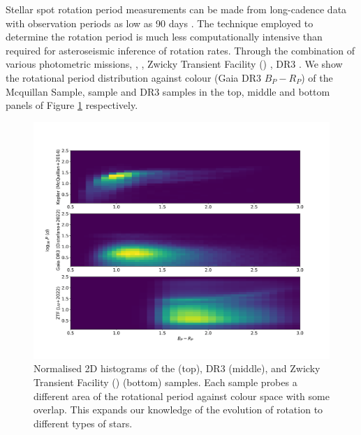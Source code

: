 Stellar spot rotation period measurements can be made from long-cadence data with observation periods as low as 90 days \citep{mcquillan_rotation_2014}.
The technique employed to determine the rotation period is much less computationally intensive than required for asteroseismic inference of rotation rates.
Through the combination of various photometric missions, \kepler{} \citep{mcquillan_rotation_2014, santos_surface_2021}, \ktoo{} \citep{santos_surface_2021}, Zwicky Transient Facility (\ZTF) \citep{lu_bridging_2022}, \gaia{} DR3 \citep{distefano_gaia_2022}. %
We show the rotational period distribution against colour (Gaia DR3 $B_P - R_P$) of the \kepler{} Mcquillan Sample, \ZTF{} sample and \gaia{} DR3 samples in the top, middle and bottom panels of Figure \ref{fig:rot_comp} respectively.

\begin{figure}[h]
    \includegraphics[width=\textwidth]{Figures/intro_figures/rot_comp.png}
    \caption[2D normalised histograms of the \kepler, \gaia, and \tess{} rotational period distributions]{Normalised 2D histograms of the \kepler{} \citep{mcquillan_rotation_2014} (top), \gaia{} DR3 \citep{distefano_gaia_2022} (middle), and Zwicky Transient Facility (\ZTF) \citep{lu_bridging_2022} (bottom) samples. Each sample probes a different area of the rotational period against colour space with some overlap. This expands our knowledge of the evolution of rotation to different types of stars.  }
    \label{fig:rot_comp}
\end{figure}


